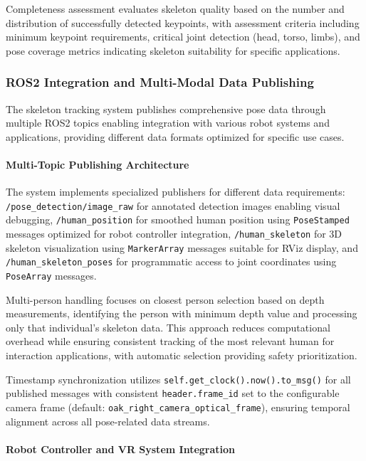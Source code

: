 Completeness assessment evaluates skeleton quality based on the number and distribution of successfully detected keypoints, with assessment criteria including minimum keypoint requirements, critical joint detection (head, torso, limbs), and pose coverage metrics indicating skeleton suitability for specific applications.

\subsubsection{ROS2 Integration and Multi-Modal Data Publishing}

The skeleton tracking system publishes comprehensive pose data through multiple ROS2 topics enabling integration with various robot systems and applications, providing different data formats optimized for specific use cases.

\paragraph{Multi-Topic Publishing Architecture}

The system implements specialized publishers for different data requirements: \texttt{/pose\_detection/image\_raw} for annotated detection images enabling visual debugging, \texttt{/human\_position} for smoothed human position using \texttt{PoseStamped} messages optimized for robot controller integration, \texttt{/human\_skeleton} for 3D skeleton visualization using \texttt{MarkerArray} messages suitable for RViz display, and \texttt{/human\_skeleton\_poses} for programmatic access to joint coordinates using \texttt{PoseArray} messages.

Multi-person handling focuses on closest person selection based on depth measurements, identifying the person with minimum depth value and processing only that individual's skeleton data. This approach reduces computational overhead while ensuring consistent tracking of the most relevant human for interaction applications, with automatic selection providing safety prioritization.

Timestamp synchronization utilizes \texttt{self.get\_clock().now().to\_msg()} for all published messages with consistent \texttt{header.frame\_id} set to the configurable camera frame (default: \texttt{oak\_right\_camera\_optical\_frame}), ensuring temporal alignment across all pose-related data streams.

\paragraph{Robot Controller and VR System Integration}

